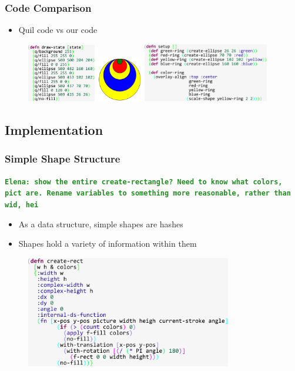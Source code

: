 \documentclass{beamer}
\newcommand{\comment}[1]{{\bf \tt  {#1}}}
\newcommand{\emcomment}[1]{\textcolor{ForestGreen}{\comment{Elena: {#1}}}}
\begin{document}
\begin{frame}
\frametitle{Code Comparison}
	\begin{itemize}
		\item Quil code vs our code 
	\end{itemize}
	\begin{figure}
	\hspace{-0.4cm}
	\includegraphics[width=3cm]{PresentationImages/theirRingsCode.pdf}
	\hspace{0.1cm}
	\includegraphics[width=2cm]{PresentationImages/rings.png}
	\hspace{0.1cm}
	\includegraphics[width=5.5cm]{PresentationImages/ourRingsCode.pdf}
	\end{figure}
\end{frame}


\subsection{Implementation}


\begin{frame}
\frametitle{Simple Shape Structure}
\emcomment{show the entire create-rectangle? Need to know what colors, pict are. Rename variables to something more reasonable, rather than wid, hei}
	\begin{itemize}
		\item As a data structure, simple shapes are hashes
		\item Shapes hold a variety of information within them
	\end{itemize}
	\begin{figure}
		\includegraphics[width=9cm]{PresentationImages/rectHashmap.pdf}
	\end{figure}
\end{frame}
\end{document}
